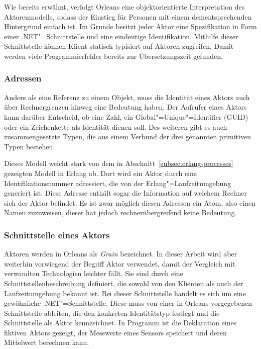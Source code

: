 Wie bereits erwähnt, verfolgt Orleans eine objektorientierte Interpretation des Aktorenmodells, sodass der Einstieg für Personen mit einem dementsprechenden Hintergrund einfach ist. 
Im Grunde besitzt jeder Aktor eine Spezifikation in Form einer .NET"=Schnittstelle und eine eindeutige Identifikation. Mithilfe dieser Schnittstelle können Klient statisch typisiert auf Aktoren zugreifen. Damit werden viele Programmierfehler bereits zur Übersetzungszeit gefunden.

\subsubsection{Adressen}

Anders als eine Referenz zu einem Objekt, muss die Identität eines Aktors auch über Rechnergrenzen hinweg eine Bedeutung haben. Der Aufrufer eines Aktors kann darüber Entscheid, ob eine Zahl, ein Global"=Unique"=Identifier (GUID) oder ein Zeichenkette als Identität dienen soll. Des weiteren gibt es auch zusammengesetzte Typen, die aus einem Verbund der drei genannten primitiven Typen bestehen.

Dieses Modell weicht stark von dem in Abschnitt~\ref{subsec:erlang-processes} gezeigten Modell in Erlang ab. Dort wird ein Aktor durch eine Identifikationsnummer adressiert, die von der Erlang"=Laufzeitumgebung generiert ist. Diese Adresse enthält sogar die Information auf welchem Rechner sich der Aktor befindet. Es ist zwar möglich diesen Adressen ein Atom, also einen Namen zuzuweisen, dieser hat jedoch rechnerübergreifend keine Bedeutung.

\subsubsection{Schnittstelle eines Aktors}

Aktoren werden in Orleans als \textit{Grain} bezeichnet. In dieser Arbeit wird aber weiterhin vorwiegend der Begriff Aktor verwendet, damit der Vergleich mit verwandten Technologien leichter fällt. Sie sind durch eine Schnittstellenbeschreibung definiert, die sowohl von den Klienten als auch der Laufzeitumgebung bekannt ist. Bei dieser Schnittstelle handelt es sich um eine gewöhnliche .NET"=Schnittstelle. Diese muss von einer in Orleans vorgegebenen Schnittstelle ableiten, die den konkreten Identitätstyp festlegt und die Schnittstelle als Aktor kennzeichnet. In Programm ist die Deklaration eines fiktiven Aktors gezeigt, der Messwerte eines Sensors speichert und deren Mittelwert berechnen kann.

